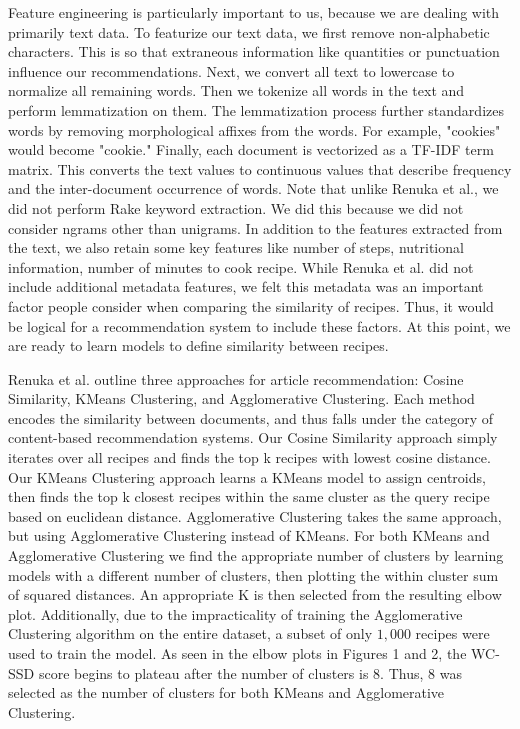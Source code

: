 \documentclass[sigconf]{acmart}
\begin{document}
Feature engineering is particularly important to us, because we are dealing with primarily text data. To featurize our text data, we first remove non-alphabetic characters. This is so that extraneous information like quantities or punctuation influence our recommendations. Next, we convert all text to lowercase to normalize all remaining words. Then we tokenize all words in the text and perform lemmatization on them. The lemmatization process further standardizes words by removing morphological affixes from the words. For example, "cookies" would become "cookie." Finally, each document is vectorized as a TF-IDF term matrix. This converts the text values to continuous values that describe frequency and the inter-document occurrence of words. Note that unlike Renuka et al., we did not perform Rake keyword extraction. We did this because we did not consider ngrams other than unigrams. In addition to the features extracted from the text, we also retain some key features like number of steps, nutritional information, number of minutes to cook recipe. While Renuka et al. did not include additional metadata features, we felt this metadata was an important factor people consider when comparing the similarity of recipes. Thus, it would be logical for a recommendation system to include these factors. At this point, we are ready to learn models to define similarity between recipes.

Renuka et al. outline three approaches for article recommendation: Cosine Similarity, KMeans Clustering, and Agglomerative Clustering. Each method encodes the similarity between documents, and thus falls under the category of content-based recommendation systems. Our Cosine Similarity approach simply iterates over all recipes and finds the top k recipes with lowest cosine distance. Our KMeans Clustering approach learns a KMeans model to assign centroids, then finds the top k closest recipes within the same cluster as the query recipe based on euclidean distance. Agglomerative Clustering takes the same approach, but using Agglomerative Clustering instead of KMeans. For both KMeans and Agglomerative Clustering we find the appropriate number of clusters by learning models with a different number of clusters, then plotting the within cluster sum of squared distances. An appropriate K is then selected from the resulting elbow plot. Additionally, due to the impracticality of training the Agglomerative Clustering algorithm on the entire dataset, a subset of only $1,000$ recipes were used to train the model. As seen in the elbow plots in Figures 1 and 2, the WC-SSD score begins to plateau after the number of clusters is $8$. Thus, $8$ was selected as the number of clusters for both KMeans and Agglomerative Clustering.
\end{document}

